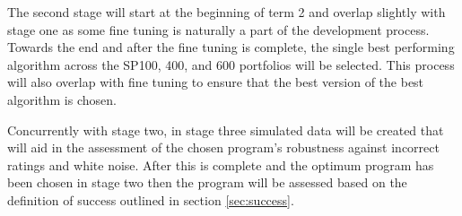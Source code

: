 The second stage will start at the beginning of term 2 and overlap slightly with stage one as some fine tuning is naturally a part of the development process. Towards the end and after the fine tuning is complete, the single best performing algorithm across the SP100, 400, and 600 portfolios will be selected. This process will also overlap with fine tuning to ensure that the best version of the best algorithm is chosen.

Concurrently with stage two, in stage three simulated data will be created that will aid in the assessment of the chosen program's robustness against incorrect ratings and white noise. After this is complete and the optimum program has been chosen in stage two then the program will be assessed based on the definition of success outlined in section \ref{sec:success}.

